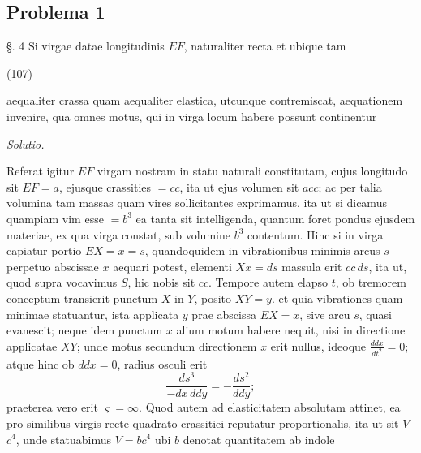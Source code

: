 \documentclass[11pt,a4paper]{article}
\begin{document}
\subsection{Problema 1}

§. 4 Si virgae datae longitudinis $EF$, naturaliter recta et ubique tam

(107)

aequaliter crassa quam aequaliter elastica, utcunque contremiscat,
aequationem invenire, qua omnes motus, qui in virga locum habere possunt
continentur

\emph{Solutio.}

Referat igitur $EF$ virgam nostram in statu naturali constitutam, cujus
longitudo sit $EF = a$, ejusque crassities $= cc$, ita ut ejus volumen sit
$acc$; ac per talia volumina tam massas quam vires sollicitantes exprimamus,
ita ut si dicamus quampiam vim esse $= b^3$ ea tanta sit intelligenda,
quantum foret pondus ejusdem materiae, ex qua virga constat, sub volumine
$b^3$ contentum. Hinc si in virga capiatur portio $EX = x = s$, quandoquidem
in vibrationibus minimis arcus $s$ perpetuo abscissae $x$ aequari potest,
elementi $Xx = ds$ massula erit $cc\,ds$, ita ut, quod supra vocavimus $S$,
hic nobis sit $cc$. Tempore autem elapso $t$, ob tremorem conceptum
transierit punctum $X$ in $Y$, posito $XY = y$. et quia vibrationes quam
minimae statuantur, ista applicata $y$ prae abscissa $EX = x$, sive arcu
$s$, quasi evanescit; neque idem punctum $x$ alium motum habere nequit, nisi
in directione applicatae $XY$; unde motus secundum directionem $x$ erit
nullus, ideoque $\frac{ddx}{dt^2} = 0$; atque hinc ob $ddx = 0$, radius
osculi erit
\[
\frac{ds^3}{-dx\,ddy} = -\frac{ds^2}{ddy};
\]
praeterea vero erit $\varsigma = \infty$. Quod autem ad elasticitatem
absolutam attinet, ea pro similibus virgis recte quadrato crassitiei
reputatur proportionalis, ita ut sit $V$  $c^4$, unde
statuabimus $V = bc^4$ ubi $b$ denotat quantitatem ab indole
\end{document}
